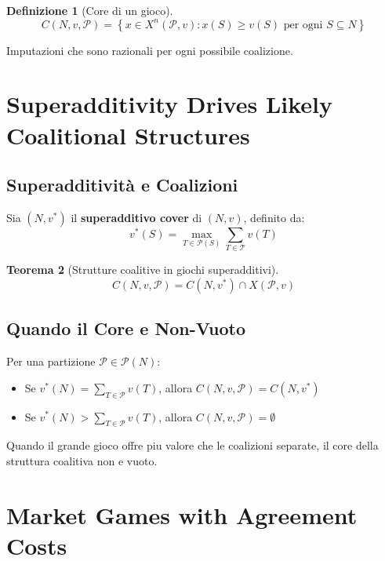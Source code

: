 \documentclass[12pt,a4paper]{article}
\theoremstyle{definition}
\newtheorem{definition}{Definizione}[section]
\newtheorem{theorem}[definition]{Teorema}
\begin{document}
\begin{definition}[Core di un gioco]
\[
C(N, v, \mathcal{P}) = \left\{ x \in X^n(\mathcal{P}, v) : x(S) \geq v(S) \text{ per ogni } S \subseteq N \right\}
\]

Imputazioni che sono razionali per ogni possibile coalizione.
\end{definition}

\newpage

\section{Superadditivity Drives Likely Coalitional Structures}

\subsection*{Superadditività e Coalizioni}

Sia $(N, v^*)$ il \textbf{superadditivo cover} di $(N, v)$, definito da:
\[
v^*(S) = \max_{T \in \mathcal{P}(S)} \sum_{T \in \mathcal{T}} v(T)
\]

\begin{theorem}[Strutture coalitive in giochi superadditivi]
\[
C(N, v, \mathcal{P}) = C(N, v^*) \cap X(\mathcal{P}, v)
\]
\end{theorem}

\subsection*{Quando il Core e Non-Vuoto}

Per una partizione $\mathcal{P} \in \mathcal{P}(N)$:

\begin{itemize}
    \item Se $v^*(N) = \sum_{T \in \mathcal{P}} v(T)$, allora $C(N, v, \mathcal{P}) = C(N, v^*)$

    \item Se $v^*(N) > \sum_{T \in \mathcal{P}} v(T)$, allora $C(N, v, \mathcal{P}) = \emptyset$
\end{itemize}

Quando il grande gioco offre piu valore che le coalizioni separate, il core della struttura coalitiva non e vuoto.

\newpage

\section{Market Games with Agreement Costs}
\end{document}

